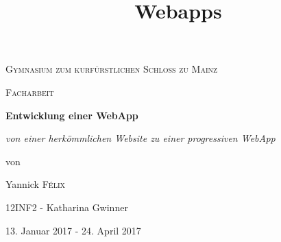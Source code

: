 \documentclass[a4paper,12pt,ngerman,listof=numbered]{scrartcl}      %
\title{Webapps}  %
\begin{document}
	
	\begin{titlepage}
		\centering
		{\scshape\Large Gymnasium zum kurf\"{u}rstlichen Schloss zu Mainz \par}
		\vspace{0.5cm}
		{\scshape\Large Facharbeit\par}
		\vspace{2.5cm}
		{\huge\bfseries Entwicklung einer WebApp\par}
		\vspace{1cm}
		{\Large\itshape von einer herkömmlichen Website zu einer progressiven WebApp\par}
		\vfill
		von\par
		Yannick \textsc{F\'elix}\par
		{\small 12INF2 - Katharina Gwinner}
		
		\vspace{3cm}
		
		{\large 13. Januar 2017 - 24. April 2017 \par}
		\newpage
	\end{titlepage}
	
	\setcounter{page}{1}
\end{document}
